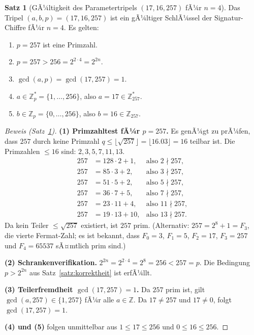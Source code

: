 ﻿\documentclass[a4paper,12pt]{scrreprt}
\theoremstyle{definition}
\newtheorem{satz}{Satz}[section]
\begin{document}
\begin{satz}[GÃ¼ltigkeit des Parametertripels $(17, 16, 257)$ fÃ¼r $n=4$]
\label{satz:param1716257}
Das Tripel $(a, b, p) = (17, 16, 257)$ ist ein gÃ¼ltiger SchlÃ¼ssel der Signatur-Chiffre fÃ¼r $n = 4$. Es gelten:
\begin{enumerate}
  \item $p = 257$ ist eine Primzahl.
  \item $p = 257 > 256 = 2^{2 \cdot 4} = 2^{2n}$.
  \item $\gcd(a, p) = \gcd(17, 257) = 1$.
  \item $a \in \mathbb{Z}_p^* = \{1, \ldots, 256\}$, also $a = 17 \in \mathbb{Z}_{257}^*$.
  \item $b \in \mathbb{Z}_p = \{0, \ldots, 256\}$, also $b = 16 \in \mathbb{Z}_{257}$.
\end{enumerate}
\end{satz}

\begin{proof}[Beweis (Satz~\ref{satz:param1716257})]
\textbf{(1) Primzahltest fÃ¼r $p = 257$.}
Es genÃ¼gt zu prÃ¼fen, dass $257$ durch keine Primzahl $q \leq \lfloor \sqrt{257} \rfloor = \lfloor 16.03 \rfloor = 16$ teilbar ist. Die Primzahlen $\leq 16$ sind: $2, 3, 5, 7, 11, 13$.
\begin{align*}
257 &= 128 \cdot 2 + 1, & \text{also } 2 \nmid 257, \\
257 &= 85 \cdot 3 + 2, & \text{also } 3 \nmid 257, \\
257 &= 51 \cdot 5 + 2, & \text{also } 5 \nmid 257, \\
257 &= 36 \cdot 7 + 5, & \text{also } 7 \nmid 257, \\
257 &= 23 \cdot 11 + 4, & \text{also } 11 \nmid 257, \\
257 &= 19 \cdot 13 + 10, & \text{also } 13 \nmid 257.
\end{align*}
Da kein Teiler $\leq \sqrt{257}$ existiert, ist $257$ prim. (Alternativ: $257 = 2^8 + 1 = F_3$, die vierte Fermat-Zahl; es ist bekannt, dass $F_0=3$, $F_1=5$, $F_2=17$, $F_3=257$ und $F_4=65537$ sÃ¤mtlich prim sind.)

\textbf{(2) Schrankenverifikation.}
$2^{2n} = 2^{2 \cdot 4} = 2^8 = 256 < 257 = p$. Die Bedingung $p > 2^{2n}$ aus Satz~\ref{satz:korrektheit} ist erfÃ¼llt.

\textbf{(3) Teilerfremdheit $\gcd(17, 257) = 1$.}
Da $257$ prim ist, gilt $\gcd(a, 257) \in \{1, 257\}$ fÃ¼r alle $a \in \mathbb{Z}$. Da $17 \neq 257$ und $17 \neq 0$, folgt $\gcd(17, 257) = 1$.

\textbf{(4) und (5)} folgen unmittelbar aus $1 \leq 17 \leq 256$ und $0 \leq 16 \leq 256$.
\end{proof}
\end{document}
